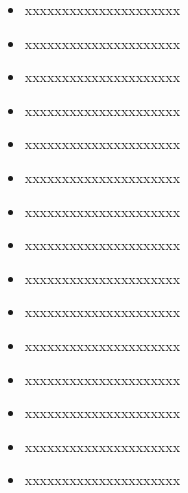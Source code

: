 \documentclass{myresume}
\begin{document}
\begin{onehalfspacing}
\raggedright{}
\begin{itemize}
  \item xxxxxxxxxxxxxxxxxxxxx
  \item xxxxxxxxxxxxxxxxxxxxx
  \item xxxxxxxxxxxxxxxxxxxxx
\end{itemize}
\end{onehalfspacing}

\begin{onehalfspacing}
\raggedright{}
\begin{itemize}
  \item xxxxxxxxxxxxxxxxxxxxx
  \item xxxxxxxxxxxxxxxxxxxxx
  \item xxxxxxxxxxxxxxxxxxxxx
  \item xxxxxxxxxxxxxxxxxxxxx
\end{itemize}
\end{onehalfspacing}

\begin{onehalfspacing}
\raggedright{}
\begin{itemize}
  \item xxxxxxxxxxxxxxxxxxxxx
  \item xxxxxxxxxxxxxxxxxxxxx
  \item xxxxxxxxxxxxxxxxxxxxx
  \item xxxxxxxxxxxxxxxxxxxxx
\end{itemize}
\end{onehalfspacing}

\raggedright{}
\begin{itemize}
  \item xxxxxxxxxxxxxxxxxxxxx
  \item xxxxxxxxxxxxxxxxxxxxx
  \item xxxxxxxxxxxxxxxxxxxxx
  \item xxxxxxxxxxxxxxxxxxxxx
\end{itemize}
\end{document}
